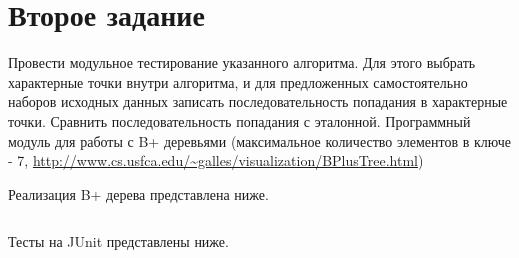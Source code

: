 \section{Второе задание}
Провести модульное тестирование указанного алгоритма.
Для этого выбрать характерные точки внутри алгоритма,
и для предложенных самостоятельно наборов исходных данных записать
последовательность попадания в характерные точки.
Сравнить последовательность попадания с эталонной.
Программный модуль для работы с B+ деревьями
(максимальное количество элементов в ключе - 7, \url{http://www.cs.usfca.edu/~galles/visualization/BPlusTree.html})

Реализация B+ дерева представлена ниже.
\inputminted[breaklines]{kotlin}{./task2/src/main/kotlin/BPlusTree.kt}

Тесты на JUnit представлены ниже.
\inputminted[breaklines]{kotlin}{./task2/src/test/kotlin/BPlusTreeTest.kt}
